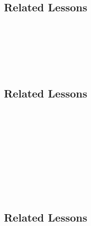 \subsection{Related Lessons}
\fourdThree{}\\
\fourdEight{}\\
\foureTwo{}\\
\foureSix{}\\
\foureTwelve{}\\
%
\subsection{Related Lessons}
\foureSix{}\\
\foureThirteen{}\\
\fourjFourteen{}\\
\fourFKEleven{}\\
\fourFKTwelve{}\\
\fourFKThirteen{}\\
\fourFKTwentyFour{}\\
\fourFKTwentyEight{}\\
\fourFKThirtyFive{}\\
%
\subsection{Related Lessons}
\foureSix{}\\
\fourFKEleven{}\\
\fourFKTwentyFour{}\\
\fourFKThirtyFour{}\\
